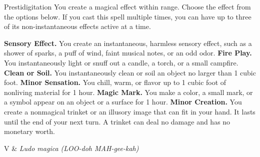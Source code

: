 \begin{Spell}[
  level=Cantrip,
  time=1 Action,
  range=10 ft,
  components={V, S},
  duration=1 Hour,
  school=Transmutation,
  attack=None,
  effect=Utility
]{Prestidigitation}
You create a magical effect within range. Choose the effect from the options below. If you cast this spell multiple times, you can have up to three of its non-instantaneous effects active at a time.

\textbf{Sensory Effect.} You create an instantaneous, harmless sensory effect, such as a shower of sparks, a puff of wind, faint musical notes, or an odd odor. \textbf{Fire Play.} You instantaneously light or snuff out a candle, a torch, or a small campfire. \textbf{Clean or Soil.} You instantaneously clean or soil an object no larger than 1 cubic foot. \textbf{Minor Sensation.} You chill, warm, or flavor up to 1 cubic foot of nonliving material for 1 hour. \textbf{Magic Mark.} You make a color, a small mark, or a symbol appear on an object or a surface for 1 hour. \textbf{Minor Creation.} You create a nonmagical trinket or an illusory image that can fit in your hand. It lasts until the end of your next turn. A trinket can deal no damage and has no monetary worth.

\begin{components}
V & \textit{Ludo magica (LOO-doh MAH-gee-kah)}
\end{components}
\end{Spell}


